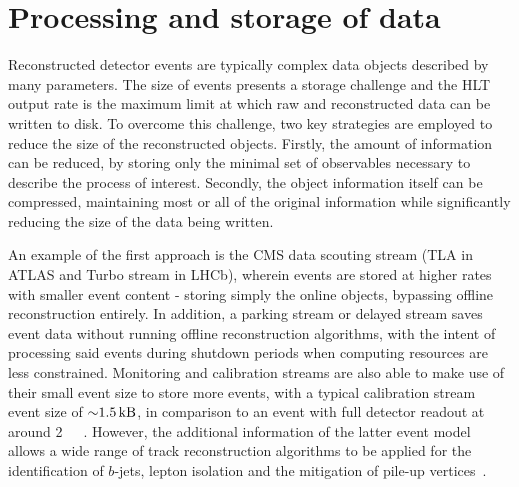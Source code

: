 \section{Processing and storage of data}
\label{sec:data}

Reconstructed detector events are typically complex data objects described by many parameters. 
The size of events presents a storage challenge and the HLT output rate is the maximum limit at which raw and reconstructed data can be written to disk.
To overcome this challenge, two key strategies are employed to reduce the size of the reconstructed objects. Firstly, the amount of information can be reduced, by storing only the minimal set of observables necessary to describe the process of interest. Secondly, the object information itself can be compressed, maintaining most or all of the original information while significantly reducing the size of the data being written.

An example of the first approach is the CMS data scouting stream (TLA in ATLAS and Turbo stream in LHCb), wherein events are stored at higher rates with smaller event content - storing simply the online objects, bypassing offline reconstruction entirely. In addition, a parking stream or delayed stream saves event data without running offline reconstruction algorithms, with the intent of processing said events during shutdown periods when computing resources are less constrained. Monitoring and calibration streams are also able to make use of their small event size to store more events, with a typical calibration stream event size of ${\sim}\SI{1.5}{\kilo\byte}$, in comparison to an event with full detector readout at around \SI{2}{\mega\byte}~\cite{cms2023development}. However, the additional information of the latter event model allows a wide range of track reconstruction algorithms to be applied for the identification of $b$-jets, lepton isolation and the mitigation of pile-up vertices~\cite{mia2014trackingcms,tosi2016trackingcms}. 

